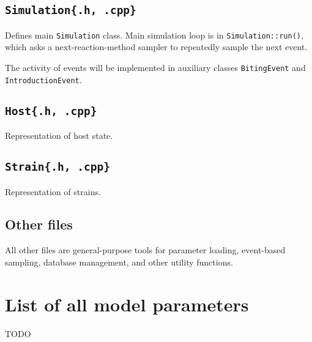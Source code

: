 \documentclass[11pt]{article}
\begin{document}
\subsection{\texttt{Simulation\{.h, .cpp\}}}

Defines main \texttt{Simulation} class. Main simulation loop is in \texttt{Simulation::run()}, which asks a next-reaction-method sampler to repeatedly sample the next event.

The activity of events will be implemented in auxiliary classes \texttt{BitingEvent} and \texttt{IntroductionEvent}.

\subsection{\texttt{Host\{.h, .cpp\}}}

Representation of host state.

\subsection{\texttt{Strain\{.h, .cpp\}}}

Representation of strains.

\subsection{Other files}

All other files are general-purpose tools for parameter loading, event-based sampling, database management, and other utility functions.

\section{List of all model parameters}

TODO
\end{document}
